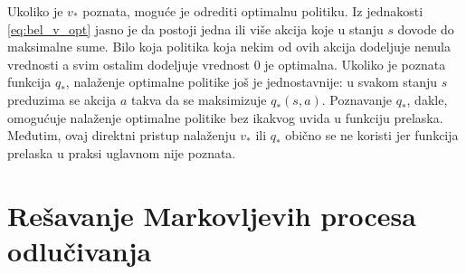 \par 
Ukoliko je $v_*$ poznata, moguće je odrediti optimalnu politiku. Iz jednakosti \eqref{eq:bel_v_opt} jasno je da postoji jedna ili više akcija koje u stanju $s$ dovode do maksimalne sume. Bilo koja politika koja nekim od ovih akcija dodeljuje nenula vrednosti a svim ostalim dodeljuje vrednost $0$ je optimalna. Ukoliko je poznata funkcija $q_*$, nalaženje optimalne politike još je jednostavnije: u svakom stanju $s$ preduzima se akcija $a$ takva da se maksimizuje $q_*(s,a)$. Poznavanje $q_*$, dakle, omogućuje nalaženje optimalne politike bez ikakvog uvida u funkciju prelaska.  Međutim, ovaj direktni pristup nalaženju $v_*$ ili $q_*$ obično se ne koristi jer funkcija prelaska u praksi uglavnom nije poznata.

\section{Rešavanje Markovljevih procesa odlučivanja}

